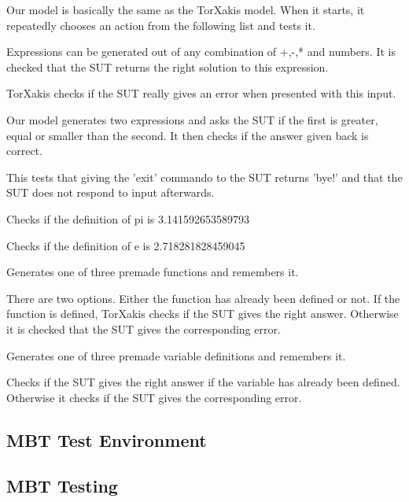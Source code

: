 \documentclass[11pt,a4paper]{article}
\begin{document}
Our model is basically the same as the TorXakis model. When it starts, it repeatedly chooses an action from the following list and tests it.
\begin{description}[labelindent=1cm]
	\item[\textbf{Expression}] Expressions can be generated out of any combination of +,-,* and numbers. It is checked that the SUT returns the right solution to this expression.
	\item[\textbf{1/0}] TorXakis checks if the SUT really gives an error when presented with this input.
	\item[\textbf{equality}] Our model generates two expressions and asks the SUT if the first is greater, equal or smaller than the second. It then checks if the answer given back is correct.
	\item[\textbf{exit}] This tests that giving the 'exit' commando to the SUT returns 'bye!' and that the SUT does not respond to input afterwards.
	\item[\textbf{pi}] Checks if the definition of pi is 3.141592653589793
	\item[\textbf{e}] Checks if the definition of e is 2.718281828459045
	\item[\textbf{function definition}] Generates one of three premade functions and remembers it.
	\item[\textbf{function application}] There are two options. Either the function has already been defined or not. If the function is defined, TorXakis checks if the SUT gives the right answer. Otherwise it is checked that the SUT gives the corresponding error.
	\item[\textbf{variable definition}] Generates one of three premade variable definitions and remembers it.
	\item[\textbf{variable application}] Checks if the SUT gives the right answer if the variable has already been defined. Otherwise it checks if the SUT gives the corresponding error.
\end{description}



\subsection{MBT Test Environment}



\subsection{MBT Testing}
\end{document}
